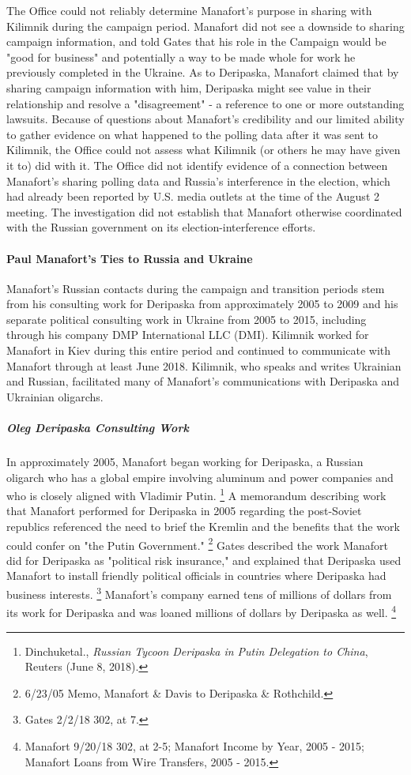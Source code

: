 The Office could not reliably determine Manafort's purpose in sharing with Kilimnik during the campaign period.
Manafort
did not see a downside to sharing campaign information, and told Gates that his role in the Campaign would be "good for business" and potentially a way to be made whole for work he previously completed in the Ukraine.
As to Deripaska, Manafort claimed that by sharing campaign information with him, Deripaska might see value in their relationship and resolve a "disagreement" - a reference to one or more outstanding lawsuits.
Because of questions about Manafort's credibility and our limited ability to gather evidence on what happened to the polling data after it was sent to Kilimnik, the Office could not assess what Kilimnik (or others he may have given it to) did with it.
The Office did not identify evidence of a connection between Manafort's sharing polling data and Russia's interference in the election, which had already been reported by U.S. media outlets at the time of the August 2 meeting.
The investigation did not establish that Manafort otherwise coordinated with the Russian government on its election-interference efforts.

\paragraph{Paul Manafort's Ties to Russia and Ukraine}

Manafort's Russian contacts during the campaign and transition periods stem from his consulting work for Deripaska from approximately 2005 to 2009 and his separate political consulting work in Ukraine from 2005 to 2015, including through his company DMP International LLC (DMI).
Kilimnik worked for Manafort in Kiev during this entire period and continued to communicate with Manafort through at least June 2018.
Kilimnik, who speaks and writes Ukrainian and Russian, facilitated many of Manafort's communications with Deripaska and Ukrainian oligarchs.

\subparagraph{Oleg Deripaska Consulting Work}

In approximately 2005, Manafort began working for Deripaska, a Russian oligarch who has a global empire involving aluminum and power companies and who is closely aligned with Vladimir Putin.%
\footnote{Dinchuketal., \textit{Russian Tycoon Deripaska in Putin Delegation to China}, Reuters (June 8, 2018).}
A memorandum describing work that Manafort performed for Deripaska in 2005 regarding the post-Soviet republics referenced the need to brief the Kremlin and the benefits that the work could confer on "the Putin Government."%
\footnote{6/23/05 Memo, Manafort \& Davis to Deripaska \& Rothchild.}
Gates described the work Manafort did for Deripaska as "political risk insurance," and explained that Deripaska used Manafort to install friendly political officials in countries where Deripaska had business interests.%
\footnote{Gates 2/2/18 302, at 7.}
Manafort's company earned tens of millions of dollars from its work for Deripaska and was loaned millions of dollars by Deripaska as well.%
\footnote{Manafort 9/20/18 302, at 2-5;
Manafort Income by Year, 2005 - 2015;
Manafort Loans from Wire Transfers, 2005 - 2015.}

